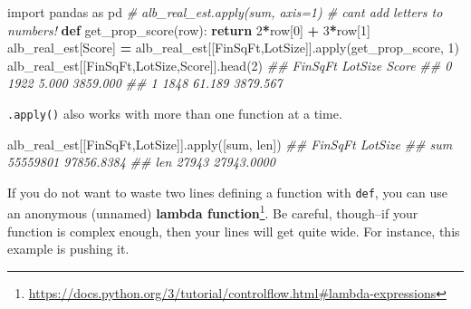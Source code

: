 \documentclass[
  12pt,
  krantz2]{krantz}
\makeatletter
\newenvironment{Shaded}{\begin{snugshade}}{\end{snugshade}}
\newcommand{\BuiltInTok}[1]{#1}
\newcommand{\CommentTok}[1]{\textcolor[rgb]{0.37,0.37,0.37}{\textit{#1}}}
\newcommand{\ControlFlowTok}[1]{\textcolor[rgb]{0.27,0.27,0.27}{\textbf{#1}}}
\newcommand{\DecValTok}[1]{\textcolor[rgb]{0.06,0.06,0.06}{#1}}
\newcommand{\ImportTok}[1]{#1}
\newcommand{\KeywordTok}[1]{\textcolor[rgb]{0.27,0.27,0.27}{\textbf{#1}}}
\newcommand{\NormalTok}[1]{#1}
\newcommand{\OperatorTok}[1]{\textcolor[rgb]{0.43,0.43,0.43}{\textbf{#1}}}
\newcommand{\StringTok}[1]{\textcolor[rgb]{0.5,0.5,0.5}{#1}}
\renewcommand{\href}[2]{#2\footnote{\url{#1}}}
\newenvironment{kframe}{%
\medskip{}
\setlength{\fboxsep}{.8em}
 \def\at@end@of@kframe{}%
 \ifinner\ifhmode%
  \def\at@end@of@kframe{\end{minipage}}%
  \begin{minipage}{\columnwidth}%
 \fi\fi%
 \def\FrameCommand##1{\hskip\@totalleftmargin \hskip-\fboxsep
 \colorbox{shadecolor}{##1}\hskip-\fboxsep
     \hskip-\linewidth \hskip-\@totalleftmargin \hskip\columnwidth}%
 \MakeFramed {\advance\hsize-\width
   \@totalleftmargin\z@ \linewidth\hsize
   \@setminipage}}%
 {\par\unskip\endMakeFramed%
 \at@end@of@kframe}
\renewenvironment{Shaded}{\begin{kframe}}{\end{kframe}}
\makeatother
\begin{document}
\begin{Shaded}
\begin{Highlighting}[]
\ImportTok{import}\NormalTok{ pandas }\ImportTok{as}\NormalTok{ pd}
\CommentTok{\# alb\_real\_est.apply(sum, axis=1) \# can\textquotesingle{}t add letters to numbers!}
\KeywordTok{def}\NormalTok{ get\_prop\_score(row):}
  \ControlFlowTok{return} \DecValTok{2}\OperatorTok{*}\NormalTok{row[}\DecValTok{0}\NormalTok{] }\OperatorTok{+} \DecValTok{3}\OperatorTok{*}\NormalTok{row[}\DecValTok{1}\NormalTok{]}
\NormalTok{alb\_real\_est[}\StringTok{\textquotesingle{}Score\textquotesingle{}}\NormalTok{] }\OperatorTok{=}\NormalTok{ alb\_real\_est[[}\StringTok{\textquotesingle{}FinSqFt\textquotesingle{}}\NormalTok{,}\StringTok{\textquotesingle{}LotSize\textquotesingle{}}\NormalTok{]].}\BuiltInTok{apply}\NormalTok{(get\_prop\_score, }\DecValTok{1}\NormalTok{)}
\NormalTok{alb\_real\_est[[}\StringTok{\textquotesingle{}FinSqFt\textquotesingle{}}\NormalTok{,}\StringTok{\textquotesingle{}LotSize\textquotesingle{}}\NormalTok{,}\StringTok{\textquotesingle{}Score\textquotesingle{}}\NormalTok{]].head(}\DecValTok{2}\NormalTok{)}
\CommentTok{\#\#    FinSqFt  LotSize     Score}
\CommentTok{\#\# 0     1922    5.000  3859.000}
\CommentTok{\#\# 1     1848   61.189  3879.567}
\end{Highlighting}
\end{Shaded}

\texttt{.apply()} also works with more than one function at a time.

\begin{Shaded}
\begin{Highlighting}[]
\NormalTok{alb\_real\_est[[}\StringTok{\textquotesingle{}FinSqFt\textquotesingle{}}\NormalTok{,}\StringTok{\textquotesingle{}LotSize\textquotesingle{}}\NormalTok{]].}\BuiltInTok{apply}\NormalTok{([}\BuiltInTok{sum}\NormalTok{, }\BuiltInTok{len}\NormalTok{])}
\CommentTok{\#\#       FinSqFt     LotSize}
\CommentTok{\#\# sum  55559801  97856.8384}
\CommentTok{\#\# len     27943  27943.0000}
\end{Highlighting}
\end{Shaded}

If you do not want to waste two lines defining a function with \texttt{def}, you can use an anonymous (unnamed) \href{https://docs.python.org/3/tutorial/controlflow.html\#lambda-expressions}{\textbf{lambda function}}. Be careful, though--if your function is complex enough, then your lines will get quite wide. For instance, this example is pushing it.
\end{document}
